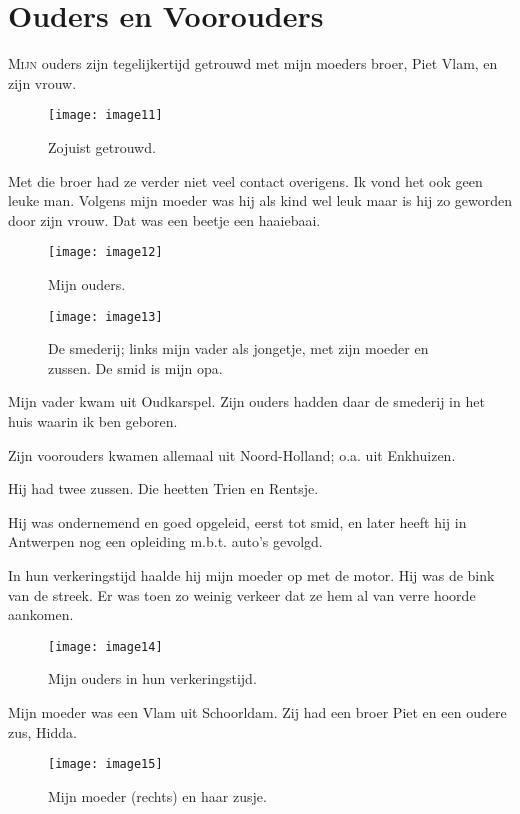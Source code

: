 \chapter*{Ouders en Voorouders}
\lettrine[lines=2, loversize=0.3, lraise=0]{\initfamily M}{ijn }
ouders zijn tegelijkertijd getrouwd met mijn moeders broer, Piet Vlam, en zijn vrouw. 
\begin{figure}[h]
    \begin{centering}
    \texttt{[image: image11]}
    \caption{Zojuist getrouwd.}
    \end{centering}
\end{figure}

Met die broer had ze verder niet veel contact overigens. Ik vond het ook geen leuke man.
Volgens mijn moeder was hij als kind wel leuk maar is hij zo geworden door zijn vrouw. Dat was een beetje een haaiebaai.

\begin{figure}[h]
    \texttt{[image: image12]}
    \caption{Mijn ouders.}
\end{figure}

\begin{figure}[h]
    \texttt{[image: image13]}
    \caption{De smederij; links mijn vader als jongetje, met zijn moeder en zussen. De smid is mijn opa.}
\end{figure}

Mijn vader kwam uit Oudkarspel. Zijn ouders hadden daar de smederij in het huis waarin ik ben geboren. 

Zijn voorouders kwamen allemaal uit Noord-Holland; o.a. uit Enkhuizen. 

Hij had twee zussen. Die heetten Trien en Rentsje.

Hij was ondernemend en goed opgeleid, eerst tot smid, en later heeft hij in Antwerpen nog een opleiding m.b.t. auto’s gevolgd.

In hun verkeringstijd haalde hij mijn moeder op met de motor. Hij was de bink van de streek. Er was toen zo weinig verkeer dat ze hem al van verre hoorde aankomen.

\begin{figure}[h]
    \texttt{[image: image14]}
    \caption{Mijn ouders in hun verkeringstijd.}
\end{figure}

Mijn moeder was een Vlam uit Schoorldam. Zij had een broer Piet en een oudere zus, Hidda. 

\begin{figure}[h]
    \texttt{[image: image15]}
    \caption{Mijn moeder (rechts) en haar zusje.}
\end{figure}

